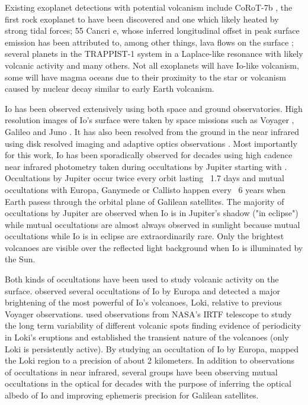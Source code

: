 \documentclass[modern]{aastex62}
\begin{document}
Existing exoplanet detections with potential volcanism include CoRoT-7b \citep{barnes2010}, the first rock exoplanet to have been discovered and one which likely heated by strong tidal forces; 55 Cancri e, whose inferred longitudinal offset in peak surface emission has been attributed to, among other things, lava flows on the surface \citep{demory2016,demory2016a,hammond2017}; several planets in the TRAPPIST-1 system in a Laplace-like resonance with likely volcanic activity \citep{kislyakova2017,dobos2019} and many others.
Not all exoplanets will have Io-like volcanism, some will have magma oceans due to their proximity to the star or volcanism caused by nuclear decay similar to early Earth volcanism.

Io has been observed extensively using both space and ground observatories.
High resolution images of Io's surface were taken by space missions such as Voyager \citep{smith1979}, Galileo \citep{belton1996} and Juno \citep{mura2020}.
It has also been resolved from the ground in the near infrared using disk resolved imaging
\citep{howell1985,simonelli1986,spencer1990} and adaptive optics observations \citep{marchis2000,marchis2005,dekleer2016}.
Most importantly for this work, Io has been sporadically observed for decades using high cadence near infrared photometry taken during occultations by Jupiter starting with \cite{spencer1990}.
Occultations by Jupiter occur twice every orbit lasting ~1.7 days and mutual occultations with Europa, Ganymede or Callisto happen every ~6 years when Earth pasess through the orbital plane of Galilean satellites.
The majority of occultations by Jupiter are observed when Io is in Jupiter's shadow ("in eclipse") while mutual occultations are almost always observed in sunlight because mutual occultations while Io is in eclipse are extraordinarily rare.
Only the brightest volcanoes are visible over the reflected light background when Io is illuminated by the Sun\citep{veeder1994,dekleer2016a}.

Both kinds of occultations have been used to study volcanic activity on the surface.
\cite{spencer1994} observed several occultations of Io by Europa and detected a major brightening of the most powerful of Io's volcanoes, Loki, relative to previous Voyager observations.
\cite{rathbun2002, rathbun2006,rathbun2010} used observations from NASA's IRTF telescope to study the long term variability of different volcanic spots finding evidence of periodicity in Loki's eruptions and established the transient nature of the volcanoes (only Loki is persistently active).
By studying an occultation of Io by Europa, \cite{dekleer2017} mapped the Loki region to a precision of about 2 kilometers.
In addition to observations of occultations in near infrared, several groups have been observing mutual occultations in the optical \citep[][and references therein]{arlot1974,saquet2018,morgado2016a} for decades with the purpose of inferring the optical albedo of Io and improving ephemeris precision for Galilean satellites.
\end{document}
